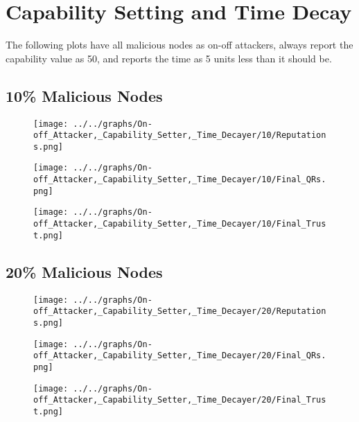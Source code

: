 \section*{Capability Setting and Time Decay}
The following plots have all malicious nodes as on-off attackers, always
report the capability value as 50, and reports the time as 5 units less than
it should be.
\\
\begin{minipage}[t]{0.49\columnwidth}
\subsection*{10\% Malicious Nodes}
    \begin{figure}[H]
        \centering
        \texttt{[image: ../../graphs/On-off\_Attacker,\_Capability\_Setter,\_Time\_Decayer/10/Reputations.png]}
    \end{figure}
    \begin{figure}[H]
        \centering
        \texttt{[image: ../../graphs/On-off\_Attacker,\_Capability\_Setter,\_Time\_Decayer/10/Final\_QRs.png]}
    \end{figure}
\end{minipage}
\begin{minipage}[t]{0.49\columnwidth}
    \begin{figure}[H]
        \centering
        \texttt{[image: ../../graphs/On-off\_Attacker,\_Capability\_Setter,\_Time\_Decayer/10/Final\_Trust.png]}
    \end{figure}
\end{minipage}

\begin{minipage}[t]{0.49\columnwidth}
\subsection*{20\% Malicious Nodes}
    \begin{figure}[H]
        \centering
        \texttt{[image: ../../graphs/On-off\_Attacker,\_Capability\_Setter,\_Time\_Decayer/20/Reputations.png]}
    \end{figure}
    \begin{figure}[H]
        \centering
        \texttt{[image: ../../graphs/On-off\_Attacker,\_Capability\_Setter,\_Time\_Decayer/20/Final\_QRs.png]}
    \end{figure}
\end{minipage}
\begin{minipage}[t]{0.49\columnwidth}
    \begin{figure}[H]
        \centering
        \texttt{[image: ../../graphs/On-off\_Attacker,\_Capability\_Setter,\_Time\_Decayer/20/Final\_Trust.png]}
    \end{figure}
\end{minipage}

